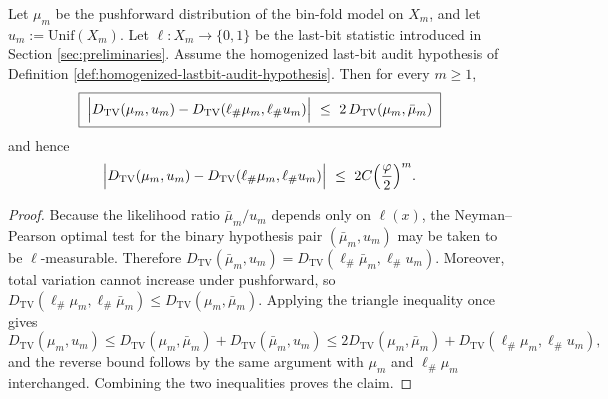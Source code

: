 \begin{theorem}\label{thm:window6-binfold-lastbit-lecam-equivalence}
Let \(\mu_m\) be the pushforward distribution of the bin-fold model on \(X_m\), and let \(u_m:=\mathrm{Unif}(X_m)\).
Let \(\ell:X_m\to\{0,1\}\) be the last-bit statistic introduced in Section \ref{sec:preliminaries}.
Assume the homogenized last-bit audit hypothesis of Definition \ref{def:homogenized-lastbit-audit-hypothesis}.
Then for every \(m\ge 1\),
\[
\boxed{\;
\Bigl|D_{\mathrm{TV}}(\mu_m,u_m)-D_{\mathrm{TV}}(\ell_\#\mu_m,\ell_\#u_m)\Bigr|
\ \le\ 2\,D_{\mathrm{TV}}(\mu_m,\bar\mu_m)\;}
\]
and hence
\[
\Bigl|D_{\mathrm{TV}}(\mu_m,u_m)-D_{\mathrm{TV}}(\ell_\#\mu_m,\ell_\#u_m)\Bigr|
\ \le\ 2C\Bigl(\frac{\varphi}{2}\Bigr)^m.
\]
\end{theorem}
\begin{proof}
Because the likelihood ratio \(\bar\mu_m/u_m\) depends only on \(\ell(x)\), the Neyman--Pearson optimal test for the binary hypothesis pair \((\bar\mu_m,u_m)\) may be taken to be \(\ell\)-measurable.
Therefore
\(
D_{\mathrm{TV}}(\bar\mu_m,u_m)=D_{\mathrm{TV}}(\ell_\#\bar\mu_m,\ell_\#u_m)
\).
Moreover, total variation cannot increase under pushforward, so
\(
D_{\mathrm{TV}}(\ell_\#\mu_m,\ell_\#\bar\mu_m)\le D_{\mathrm{TV}}(\mu_m,\bar\mu_m)
\).
Applying the triangle inequality once gives
\[
D_{\mathrm{TV}}(\mu_m,u_m)
\le D_{\mathrm{TV}}(\mu_m,\bar\mu_m)+D_{\mathrm{TV}}(\bar\mu_m,u_m)
\le 2D_{\mathrm{TV}}(\mu_m,\bar\mu_m)+D_{\mathrm{TV}}(\ell_\#\mu_m,\ell_\#u_m),
\]
and the reverse bound follows by the same argument with \(\mu_m\) and \(\ell_\#\mu_m\) interchanged.
Combining the two inequalities proves the claim. \qedhere
\end{proof}

